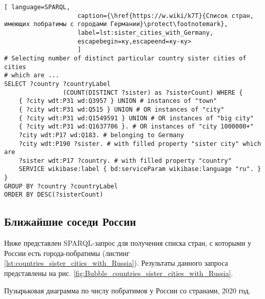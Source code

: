 \begin{lstlisting}[ language=SPARQL, 
                    caption={\href{https://w.wiki/k7T}{Список стран, имеющих побратимы с городами Германии}\protect\footnotemark},
                    label=lst:sister_cities_with_Germany, 
                    escapebegin=ку,escapeend=ку-ку>
                    ]
# Selecting number of distinct particular country sister cities of cities 
# which are ...
SELECT ?country ?countryLabel 
				(COUNT(DISTINCT ?sister) as ?sisterCount) WHERE {                                                          
	{ ?city wdt:P31 wd:Q3957 } UNION # instances of "town"
	{ ?city wdt:P31 wd:Q515 } UNION # OR instances of "city"
	{ ?city wdt:P31 wd:Q1549591 } UNION # OR instances of "big city"      
	{ ?city wdt:P31 wd:Q1637706 }. # OR instances of "city 1000000+"
	?city wdt:P17 wd:Q183. # belonging to Germany  
	?city wdt:P190 ?sister. # with filled property "sister city" which are
	?sister wdt:P17 ?country. # with filled property "country"
	SERVICE wikibase:label { bd:serviceParam wikibase:language "ru". }
}
GROUP BY ?country ?countryLabel
ORDER BY DESC(?sisterCount)\end{lstlisting}

\subsection{Ближайшие соседи России}

Ниже представлен SPARQL-запрос для получения списка стран, с которыми у России есть города-побратимы (листинг \ref{lst:countries_sister_cities_with_Russia}). Результаты данного запроса представлены на рис. \ref{fig:Bubble_countries_sister_cities_with_Russia}.

\begin{marginfigure}[0.0cm]
{
\setlength{\fboxsep}{0pt}%
\setlength{\fboxrule}{1pt}%
%
}
  \caption{Пузырьковая диаграмма по числу побратимов у России со странами, 2020 год.}%
  \label{fig:Bubble_countries_sister_cities_with_Russia}%
\end{marginfigure}


